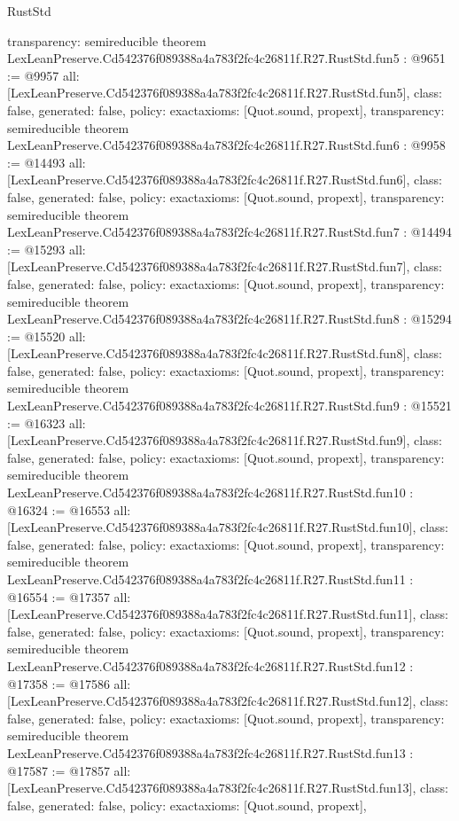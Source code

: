 \begin{lexlean}{RustStd}
\begin{coremodule}
{  transparency: semireducible
}
theorem LexLeanPreserve.Cd542376f089388a4a783f2fc4c26811f.R27.RustStd.fun5 : @9651 := @9957 {
  all: [LexLeanPreserve.Cd542376f089388a4a783f2fc4c26811f.R27.RustStd.fun5],
  class: false,
  generated: false,
  policy: exact{axioms: [Quot.sound, propext]},
  transparency: semireducible
}
theorem LexLeanPreserve.Cd542376f089388a4a783f2fc4c26811f.R27.RustStd.fun6 : @9958 := @14493 {
  all: [LexLeanPreserve.Cd542376f089388a4a783f2fc4c26811f.R27.RustStd.fun6],
  class: false,
  generated: false,
  policy: exact{axioms: [Quot.sound, propext]},
  transparency: semireducible
}
theorem LexLeanPreserve.Cd542376f089388a4a783f2fc4c26811f.R27.RustStd.fun7 : @14494 := @15293 {
  all: [LexLeanPreserve.Cd542376f089388a4a783f2fc4c26811f.R27.RustStd.fun7],
  class: false,
  generated: false,
  policy: exact{axioms: [Quot.sound, propext]},
  transparency: semireducible
}
theorem LexLeanPreserve.Cd542376f089388a4a783f2fc4c26811f.R27.RustStd.fun8 : @15294 := @15520 {
  all: [LexLeanPreserve.Cd542376f089388a4a783f2fc4c26811f.R27.RustStd.fun8],
  class: false,
  generated: false,
  policy: exact{axioms: [Quot.sound, propext]},
  transparency: semireducible
}
theorem LexLeanPreserve.Cd542376f089388a4a783f2fc4c26811f.R27.RustStd.fun9 : @15521 := @16323 {
  all: [LexLeanPreserve.Cd542376f089388a4a783f2fc4c26811f.R27.RustStd.fun9],
  class: false,
  generated: false,
  policy: exact{axioms: [Quot.sound, propext]},
  transparency: semireducible
}
theorem LexLeanPreserve.Cd542376f089388a4a783f2fc4c26811f.R27.RustStd.fun10 : @16324 := @16553 {
  all: [LexLeanPreserve.Cd542376f089388a4a783f2fc4c26811f.R27.RustStd.fun10],
  class: false,
  generated: false,
  policy: exact{axioms: [Quot.sound, propext]},
  transparency: semireducible
}
theorem LexLeanPreserve.Cd542376f089388a4a783f2fc4c26811f.R27.RustStd.fun11 : @16554 := @17357 {
  all: [LexLeanPreserve.Cd542376f089388a4a783f2fc4c26811f.R27.RustStd.fun11],
  class: false,
  generated: false,
  policy: exact{axioms: [Quot.sound, propext]},
  transparency: semireducible
}
theorem LexLeanPreserve.Cd542376f089388a4a783f2fc4c26811f.R27.RustStd.fun12 : @17358 := @17586 {
  all: [LexLeanPreserve.Cd542376f089388a4a783f2fc4c26811f.R27.RustStd.fun12],
  class: false,
  generated: false,
  policy: exact{axioms: [Quot.sound, propext]},
  transparency: semireducible
}
theorem LexLeanPreserve.Cd542376f089388a4a783f2fc4c26811f.R27.RustStd.fun13 : @17587 := @17857 {
  all: [LexLeanPreserve.Cd542376f089388a4a783f2fc4c26811f.R27.RustStd.fun13],
  class: false,
  generated: false,
  policy: exact{axioms: [Quot.sound, propext]},
}
\end{coremodule}
\end{lexlean}
